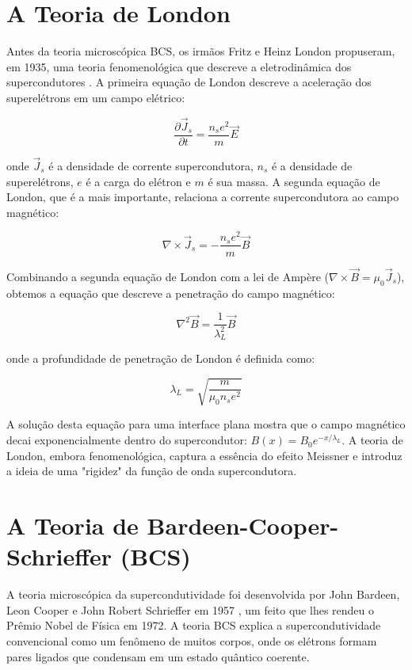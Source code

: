 \documentclass[12pt, a4paper, oneside]{report}
\begin{document}
\section{A Teoria de London}

Antes da teoria microscópica BCS, os irmãos Fritz e Heinz London propuseram, em 1935, uma teoria fenomenológica que descreve a eletrodinâmica dos supercondutores \cite{london1935}. A primeira equação de London descreve a aceleração dos superelétrons em um campo elétrico:

\begin{equation}
    \frac{\partial \vec{J}_s}{\partial t} = \frac{n_s e^2}{m} \vec{E}
\end{equation}

onde $\vec{J}_s$ é a densidade de corrente supercondutora, $n_s$ é a densidade de superelétrons, $e$ é a carga do elétron e $m$ é sua massa. A segunda equação de London, que é a mais importante, relaciona a corrente supercondutora ao campo magnético:

\begin{equation}
    \nabla \times \vec{J}_s = -\frac{n_s e^2}{m} \vec{B}
\end{equation}

Combinando a segunda equação de London com a lei de Ampère ($\nabla \times \vec{B} = \mu_0 \vec{J}_s$), obtemos a equação que descreve a penetração do campo magnético:

\begin{equation}
    \nabla^2 \vec{B} = \frac{1}{\lambda_L^2} \vec{B}
\end{equation}

onde a profundidade de penetração de London é definida como:

\begin{equation}
    \lambda_L = \sqrt{\frac{m}{\mu_0 n_s e^2}}
\end{equation}

A solução desta equação para uma interface plana mostra que o campo magnético decai exponencialmente dentro do supercondutor: $B(x) = B_0 e^{-x/\lambda_L}$. A teoria de London, embora fenomenológica, captura a essência do efeito Meissner e introduz a ideia de uma "rigidez" da função de onda supercondutora.

\section{A Teoria de Bardeen-Cooper-Schrieffer (BCS)}

A teoria microscópica da supercondutividade foi desenvolvida por John Bardeen, Leon Cooper e John Robert Schrieffer em 1957 \cite{bcs1957}, um feito que lhes rendeu o Prêmio Nobel de Física em 1972. A teoria BCS explica a supercondutividade convencional como um fenômeno de muitos corpos, onde os elétrons formam pares ligados que condensam em um estado quântico coerente.
\end{document}
